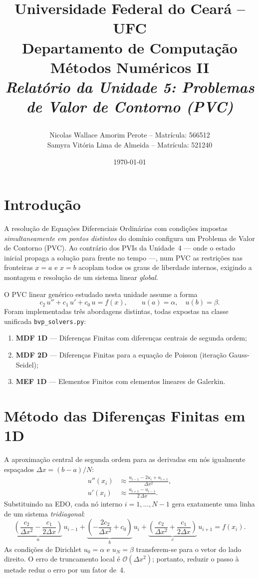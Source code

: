 \documentclass[12pt,a4paper]{article}
\title{
    \vspace{-1cm}
    \begin{center}
        \Large \textbf{Universidade Federal do Ceará -- UFC} \\
        \large Departamento de Computação \\
        \vspace{1cm}
        \Huge \textbf{Métodos Numéricos II} \\
        \vspace{0.5cm}
        \Large \textit{Relatório da Unidade 5: Problemas de Valor de Contorno (PVC)}
    \end{center}
}
\author{
    Nicolas Wallace Amorim Perote -- Matrícula: 566512 \\
    Samyra Vitória Lima de Almeida -- Matrícula: 521240
}
\date{\today}
\begin{document}
\maketitle
\tableofcontents
\newpage

\section{Introdução}
A resolução de Equações Diferenciais Ordinárias com condições impostas \emph{simultaneamente em pontos distintos} do domínio configura um Problema de Valor de Contorno (PVC). Ao contrário dos PVIs da Unidade~4 — onde o estado inicial propaga a solução para frente no tempo —, num PVC as restrições nas fronteiras $x=a$ e $x=b$ acoplam todos os graus de liberdade internos, exigindo a montagem e resolução de um sistema linear \emph{global}.

O PVC linear genérico estudado nesta unidade assume a forma
\begin{equation}
    c_2\,u'' + c_1\,u' + c_0\,u = f(x), \qquad u(a) = \alpha,\quad u(b) = \beta.
\end{equation}
Foram implementadas três abordagens distintas, todas expostas na classe unificada \texttt{bvp\_solvers.py}:
\begin{enumerate}
    \item \textbf{MDF 1D} — Diferenças Finitas com diferenças centrais de segunda ordem;
    \item \textbf{MDF 2D} — Diferenças Finitas para a equação de Poisson (iteração Gauss-Seidel);
    \item \textbf{MEF 1D} — Elementos Finitos com elementos lineares de Galerkin.
\end{enumerate}

\section{Método das Diferenças Finitas em 1D}
A aproximação central de segunda ordem para as derivadas em nós igualmente espaçados $\Delta x = (b-a)/N$:
\begin{align}
    u''(x_i) &\approx \frac{u_{i-1} - 2u_i + u_{i+1}}{\Delta x^2}, \\
    u'(x_i)  &\approx \frac{u_{i+1} - u_{i-1}}{2\,\Delta x}.
\end{align}
Substituindo na EDO, cada nó interno $i=1,\ldots,N-1$ gera exatamente uma linha de um sistema \emph{tridiagonal}:
\begin{equation}
    \underbrace{\left(\frac{c_2}{\Delta x^2} - \frac{c_1}{2\Delta x}\right)}_{a}\,u_{i-1}
    + \underbrace{\left(-\frac{2c_2}{\Delta x^2} + c_0\right)}_{b}\,u_i
    + \underbrace{\left(\frac{c_2}{\Delta x^2} + \frac{c_1}{2\Delta x}\right)}_{c}\,u_{i+1}
    = f(x_i).
\end{equation}
As condições de Dirichlet $u_0 = \alpha$ e $u_N = \beta$ transferem-se para o vetor do lado direito. O erro de truncamento local é $\mathcal{O}(\Delta x^2)$; portanto, reduzir o passo à metade reduz o erro por um fator de~4.
\end{document}
